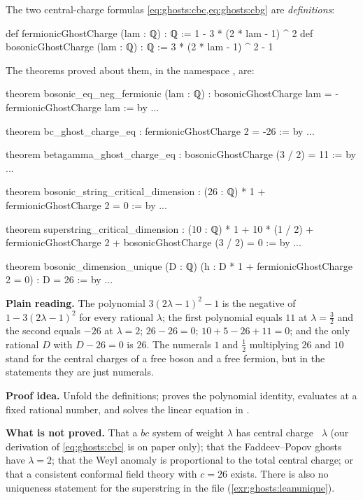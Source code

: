 \begin{leanbox}
The two central-charge formulas \cref{eq:ghosts:cbc,eq:ghosts:cbg} are \emph{definitions}:
\begin{leancode}
def fermionicGhostCharge (lam : ℚ) : ℚ := 1 - 3 * (2 * lam - 1) ^ 2
def bosonicGhostCharge (lam : ℚ) : ℚ := 3 * (2 * lam - 1) ^ 2 - 1
\end{leancode}
The theorems proved about them, in the namespace
, are:
\begin{leancode}
theorem bosonic_eq_neg_fermionic (lam : ℚ) :
    bosonicGhostCharge lam = - fermionicGhostCharge lam := by ...

theorem bc_ghost_charge_eq : fermionicGhostCharge 2 = -26 := by ...

theorem betagamma_ghost_charge_eq : bosonicGhostCharge (3 / 2) = 11 := by ...

theorem bosonic_string_critical_dimension :
    (26 : ℚ) * 1 + fermionicGhostCharge 2 = 0 := by ...

theorem superstring_critical_dimension :
    (10 : ℚ) * 1 + 10 * (1 / 2) + fermionicGhostCharge 2
      + bosonicGhostCharge (3 / 2) = 0 := by ...

theorem bosonic_dimension_unique (D : ℚ)
    (h : D * 1 + fermionicGhostCharge 2 = 0) :
    D = 26 := by ...
\end{leancode}
\textbf{Plain reading.} The polynomial $3(2\lambda-1)^2-1$ is the negative of
$1-3(2\lambda-1)^2$ for every rational $\lambda$; the first polynomial equals $11$ at
$\lambda=\tfrac32$ and the second equals $-26$ at $\lambda=2$; $26-26=0$;
$10+5-26+11=0$; and the only rational $D$ with $D-26=0$ is $26$. The numerals $1$ and
$\tfrac12$ multiplying $26$ and $10$ stand for the central charges of a free boson and a free
fermion, but in the statements they are just numerals.

\textbf{Proof idea.} Unfold the definitions;  proves the polynomial identity,
 evaluates at a fixed rational number, and  solves the linear
equation in .

\textbf{What is not proved.} That a $bc$ system of weight $\lambda$ has central charge
~$\lambda$ (our derivation of \cref{eq:ghosts:cbc} is on paper
only); that the Faddeev--Popov ghosts have $\lambda=2$; that the Weyl anomaly is proportional
to the total central charge; or that a consistent conformal field theory with $c=26$ exists.
There is also no uniqueness statement for the superstring in the file
(\cref{exr:ghosts:leanunique}).
\end{leanbox}

